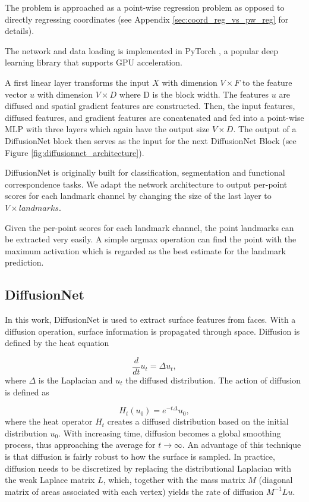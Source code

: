 \documentclass[class=article, crop=false]{standalone}
\begin{document}
The problem is approached as a point-wise regression problem as opposed to directly regressing coordinates (see Appendix \ref{sec:coord_reg_vs_pw_reg} for details).

The network and data loading is implemented in PyTorch \cite{NEURIPS2019_9015}, a popular deep learning library that supports GPU acceleration.

A first linear layer transforms the input $X$ with dimension $V \times F$ to the feature vector $u$ with dimension $V \times D$ where D is the block width. The features $u$ are diffused and spatial gradient features are constructed. Then, the input features, diffused features, and gradient features are concatenated and fed into a point-wise MLP with three layers which again have the output size $V \times D$. The output of a DiffusionNet block then serves as the input for the next DiffusionNet Block (see Figure \ref{fig:diffusionnet_architecture}).

DiffusionNet is originally built for classification, segmentation and functional correspondence tasks. We adapt the network architecture to output per-point scores for each landmark channel by changing the size of the last layer to $V \times \textit{landmarks}$.

Given the per-point scores for each landmark channel, the point landmarks can be extracted very easily. A simple argmax operation can find the point with the maximum activation which is regarded as the best estimate for the landmark prediction.

\subsection{DiffusionNet}
In this work, DiffusionNet \cite{sharp2022diffusion} is used to extract surface features from faces. With a diffusion operation, surface information is propagated through space. Diffusion is defined by the heat equation 

\begin{equation}
    \frac{d}{dt}u_t = \Delta u_t,
\end{equation}
where $\Delta$ is the Laplacian and $u_t$ the diffused distribution. The action of diffusion is defined as 

\begin{equation}
    H_t(u_0) = e^{-t\Delta}u_0,
\end{equation}
where the heat operator $H_t$ creates a diffused distribution based on the initial distribution $u_0$. With increasing time, diffusion becomes a global smoothing process, thus approaching the average for $t \to \infty$. An advantage of this technique is that diffusion is fairly robust to how the surface is sampled. In practice, diffusion needs to be discretized by replacing the distributional Laplacian with the weak Laplace matrix $L$, which, together with the mass matrix $M$ (diagonal matrix of areas associated with each vertex) yields the rate of diffusion $M^{-1}Lu$.
\end{document}
